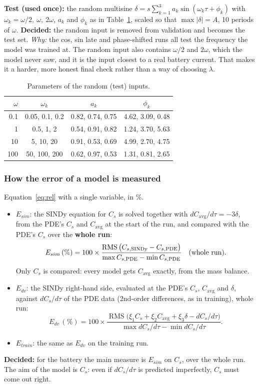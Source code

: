 \documentclass[11pt,a4paper]{article}
\newcommand{\why}{\textit{Why:} }
\newcommand{\decided}[1]{\textcolor{green!40!black}{\textbf{Decided:} #1}}
\newcommand{\RMS}{\operatorname{RMS}}
\newcommand{\avg}{\mathrm{avg}}
\begin{document}
\textbf{Test (used once):} the random multisine $\delta = s\sum_{k=1}^{3}a_k\sin(\omega_k\tau+\phi_k)$ with $\omega_k=\omega/2,\ \omega,\ 2\omega$, $a_k$ and $\phi_k$ as in Table~\ref{tab:random}, scaled so that $\max|\delta|=A$, 10 periods of $\omega$.
\decided{the random input is removed from validation and becomes the test set.}
\why the cos, sin late and phase-shifted runs all test the frequency the model was trained at. The random input also contains $\omega/2$ and $2\omega$, which the model never saw, and it is the input closest to a real battery current. That makes it a harder, more honest final check rather than a way of choosing $\lambda$.
\begin{table}[H]\centering\small
\begin{tabular}{rccc}\toprule
$\omega$ & $\omega_k$ & $a_k$ & $\phi_k$\\\midrule
0.1 & 0.05, 0.1, 0.2 & 0.82, 0.74, 0.75 & 4.62, 3.09, 0.48\\
1 & 0.5, 1, 2 & 0.54, 0.91, 0.82 & 1.24, 3.70, 5.63\\
10 & 5, 10, 20 & 0.91, 0.53, 0.69 & 4.99, 2.70, 4.75\\
100 & 50, 100, 200 & 0.62, 0.97, 0.53 & 1.31, 0.81, 2.65\\\bottomrule
\end{tabular}
\caption{Parameters of the random (test) inputs.}
\label{tab:random}
\end{table}

\subsubsection{How the error of a model is measured}\label{sec:pde-err}
Equation~\eqref{eq:rel} with a single variable, in \%.
\begin{itemize}
  \item $E_{sim}$: the SINDy equation for $C_s$ is solved together with $dC_\avg/d\tau=-3\delta$, from the PDE's $C_s$ and $C_\avg$ at the start of the run, and compared with the PDE's $C_s$ over the \textbf{whole run}:
  \[
    E_{sim}\,(\%) = 100\times\frac{\RMS\big(C_{s,\rm SINDy}-C_{s,\rm PDE}\big)}{\max C_{s,\rm PDE}-\min C_{s,\rm PDE}}\quad\text{(whole run)}.
  \]
  Only $C_s$ is compared: every model gets $C_\avg$ exactly, from the mass balance.
  \item $E_{dv}$: the SINDy right-hand side, evaluated at the PDE's $C_s$, $C_\avg$ and $\delta$, against $dC_s/d\tau$ of the PDE data (2nd-order differences, as in training), whole run:
  \[
    E_{dv}\,(\%) = 100\times\frac{\RMS\big(\xi_1C_s+\xi_2C_\avg+\xi_3\delta - dC_s/d\tau\big)}{\max dC_s/d\tau-\min dC_s/d\tau}.
  \]
  \item $E_{train}$: the same as $E_{dv}$ on the training run.
\end{itemize}
\decided{for the battery the main measure is $E_{sim}$ on $C_s$, over the whole run. The aim of the model is $C_s$: even if $dC_s/d\tau$ is predicted imperfectly, $C_s$ must come out right.}
\end{document}
